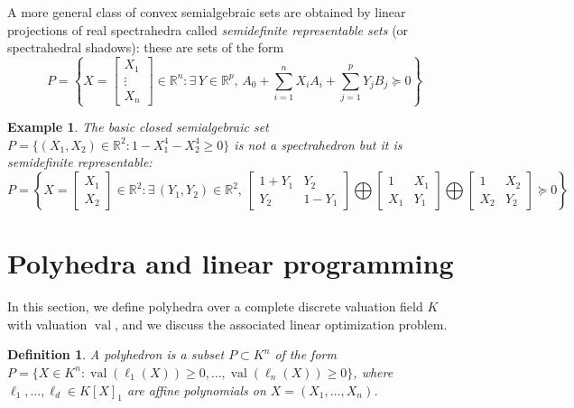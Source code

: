 \documentclass[a4paper,12pt]{article}
\newtheorem{definition}{Definition}
\newtheorem{example}{Example}
\newcommand{\R}{\mathbb{R}} %
\DeclareMathOperator{\val}{val}
\begin{document}
A more general class of convex semialgebraic sets are obtained by linear projections of real spectrahedra
called {\it semidefinite representable sets} (or spectrahedral shadows): these are sets of the form
$$
P = \left\{X = \left[\begin{smallmatrix} X_1 \\ \vdots \\ X_n \end{smallmatrix}\right] \in \R^n : \exists\,Y\in\R^p, \, A_0 + \sum_{i=1}^n X_i A_i + \sum_{j=1}^p Y_j B_j \succeq 0\right\}
$$

\begin{example}
\label{fermat_quartic}
The basic closed semialgebraic set $P = \{(X_1,X_2) \in \R^2 : 1-X_1^4-X_2^4 \geq 0\}$ is not a spectrahedron
but it is semidefinite representable:
$$
P = \left\{X = \begin{bmatrix} X_1 \\ X_2 \end{bmatrix} \in \R^2 :
\exists\, (Y_1,Y_2) \in \R^2, \,
\begin{bmatrix}
  1+Y_1 & Y_2 \\
  Y_2 & 1-Y_1
\end{bmatrix}
\bigoplus
\begin{bmatrix}
  1 & X_1 \\
  X_1 & Y_1
\end{bmatrix}
\bigoplus
\begin{bmatrix}
  1 & X_2 \\
  X_2 & Y_2
\end{bmatrix}
\succeq 0
\right\}
$$
\end{example}


\section{Polyhedra and linear programming}


In this section, we define polyhedra over a complete discrete valuation field $K$ with valuation $\val$,
and we discuss the associated linear optimization problem.

\begin{definition}
  A {\it polyhedron} is a subset $P \subset K^n$ of the form
  $P = \{X \in K^n : \val(\ell_1(X))\geq0,\ldots,\val(\ell_n(X))\geq 0\}$,
  where $\ell_1,\ldots,\ell_d \in K[X]_1$ are affine polynomials on $X = (X_1, \ldots, X_n)$.
\end{definition}
\end{document}
